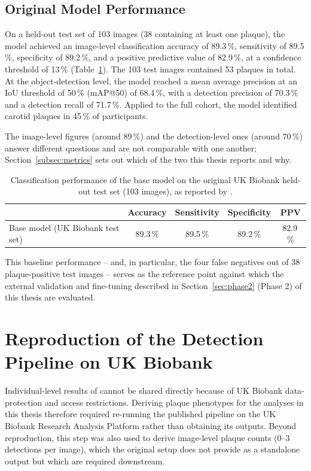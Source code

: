 \subsection{Original Model Performance}
\label{subsec:base-model-performance}
On a held-out test set of 103 images (38 containing at least one plaque), the model achieved
an image-level classification accuracy of 89.3\,\%, sensitivity of 89.5\,\%, specificity of
89.2\,\%, and a positive predictive value of 82.9\,\%, at a confidence threshold of 13\,\%
(Table~\ref{tab:base-model-performance}). The 103 test images contained 53 plaques in total. At
the object-detection level, the model reached a mean average precision at an IoU threshold of
50\,\% (mAP@50) of 68.4\,\%, with a detection precision of 70.3\,\% and a detection recall of
71.7\,\%. Applied to the full cohort, the model identified carotid plaques in 45\,\% of
participants.

The image-level figures (around 89\,\%) and the detection-level ones (around 70\,\%) answer
different questions and are not comparable with one another; Section~\ref{subsec:metrics}
sets out which of the two this thesis reports and why.

\begin{table}[H]
\centering
\caption[Original model performance]{Classification performance of the base model on the
original UK Biobank held-out test set (103 images), as reported by \textcite{omarov2024deep}.}
\label{tab:base-model-performance}
\begin{tabular}{lcccc}
\hline
& Accuracy & Sensitivity & Specificity & PPV \\
\hline
Base model (UK Biobank test set) & 89.3\,\% & 89.5\,\% & 89.2\,\% & 82.9\,\% \\
\hline
\end{tabular}
\end{table}

This baseline performance -- and, in particular, the four false negatives out of 38
plaque-positive test images -- serves as the reference point against which the external
validation and fine-tuning described in Section~\ref{sec:phase2} (Phase 2) of this thesis are
evaluated.

\section{Reproduction of the Detection Pipeline on UK Biobank}
\label{sec:reproduction}

Individual-level results of \textcite{omarov2024deep} cannot be shared directly because of UK
Biobank data-protection and access restrictions. Deriving plaque phenotypes for the analyses in
this thesis therefore required re-running the published pipeline on the UK Biobank Research
Analysis Platform rather than obtaining its outputs. Beyond reproduction, this step was also used
to derive image-level plaque counts (0--3 detections per image), which the original setup does
not provide as a standalone output but which are required downstream.

